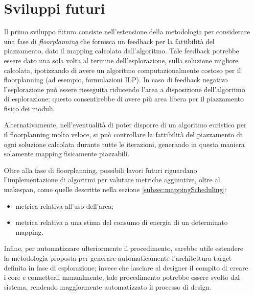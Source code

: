 \section{Sviluppi futuri}
\label{sec:sviluppiFuturi}
Il primo sviluppo futuro consiste nell'estensione della metodologia per considerare una fase di
\emph{floorplanning} che fornisca un feedback per la fattibilit\`a del piazzamento, dato
il mapping calcolato dall'algoritmo. Tale feedback potrebbe essere dato una sola volta al termine
dell'esplorazione, sulla soluzione migliore calcolata, ipotizzando di avere un algoritmo
computazionalmente costoso per il floorplanning (ad esempio, formulazioni \ac{ILP}). In caso di feedback negativo l'esplorazione pu\`o essere rieseguita
riducendo l'area a disposizione dell'algoritmo di esplorazione; questo consentirebbe di avere pi\`u area libera
per il piazzamento fisico dei moduli.

Alternativamente, nell'eventualit\`a di poter disporre di un algoritmo euristico per il floorplanning molto veloce, si pu\`o
controllare la fattibilit\`a del piazzamento di ogni soluzione calcolata durante tutte le iterazioni, generando in
questa maniera solamente mapping fisicamente piazzabili.

Oltre alla fase di floorplanning, possibili lavori futuri riguardano l'implementazione di
algoritmi per valutare metriche aggiuntive, oltre al makespan, come quelle descritte
nella sezione \ref{subsec:mappingScheduling}:
\begin{itemize}
 \item metrica relativa all'uso dell'area;
 \item metrica relativa a una stima del consumo di energia di un determinato mapping.
\end{itemize}


Infine, per automatizzare ulteriormente il procedimento, sarebbe utile estendere la metodologia
proposta per generare automaticamente l'architettura target definita in fase di esplorazione; invece
che lasciare al designer il compito di creare i core e connetterli manualmente, tale procedimento
potrebbe essere svolto dal sistema, rendendo maggiormente automatizzato il processo di design.
